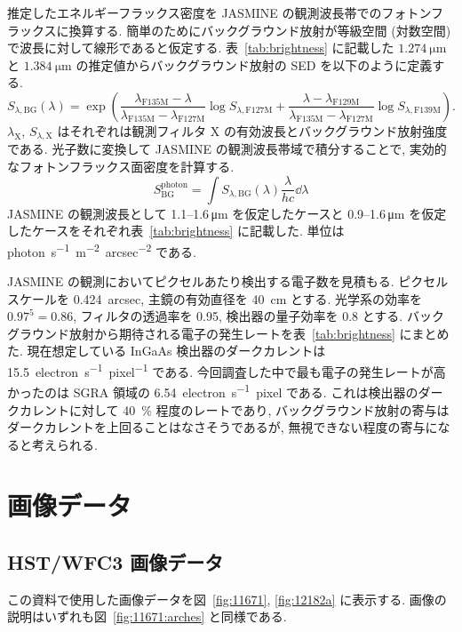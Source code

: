 \documentclass[10pt,a4paper,dvipdfmx,uplatex]{jsarticle}
\begin{document}
推定したエネルギーフラックス密度を JASMINE の観測波長帯でのフォトンフラックスに換算する. 簡単のためにバックグラウンド放射が等級空間 (対数空間) で波長に対して線形であると仮定する. 表~\ref{tab:brightness} に記載した $\SI{1.274}{\micro\meter}$ と $\SI{1.384}{\micro\meter}$ の推定値からバックグラウンド放射の SED を以下のように定義する.
\begin{equation}
  S_{\lambda,\text{BG}}(\lambda) =
  \exp(
    \frac{\lambda_\text{F135M}-\lambda}{\lambda_\text{F135M}-\lambda_\text{F127M}}
    \log{S_{\lambda,\text{F127M}}}
    +\frac{\lambda-\lambda_\text{F129M}}{\lambda_\text{F135M}-\lambda_\text{F127M}}
    \log{S_{\lambda,\text{F139M}}}
  ).
  \label{eq:sed}
\end{equation}
$\lambda_\text{X}$, $S_{\lambda,\text{X}}$ はそれぞれは観測フィルタ X の有効波長とバックグラウンド放射強度である. 光子数に変換して JASMINE の観測波長帯域で積分することで, 実効的なフォトンフラックス面密度を計算する.
\begin{equation}
  S^\text{photon}_\text{BG}
  = \int S_{\lambda,\text{BG}}(\lambda) \frac{\lambda}{hc} \dd{\lambda}
\end{equation}
JASMINE の観測波長として \numrange{1.1}{1.6}\,\unit{\micro\meter} を仮定したケースと \numrange{0.9}{1.6}\,\unit{\micro\meter} を仮定したケースをそれぞれ表~\ref{tab:brightness} に記載した. 単位は \unit{photon.s^{-1}.m^{-2}.arcsec^{-2}} である.

JASMINE の観測においてピクセルあたり検出する電子数を見積もる. ピクセルスケールを \SI{0.424}{arcsec}, 主鏡の有効直径を \SI{40}{\centi\meter} とする. 光学系の効率を $0.97^5 = 0.86$, フィルタの透過率を 0.95, 検出器の量子効率を 0.8 とする. バックグラウンド放射から期待される電子の発生レートを表~\ref{tab:brightness} にまとめた. 現在想定している InGaAs 検出器のダークカレントは \SI{15.5}{electron.s^{-1}.pixel^{-1}} である. 今回調査した中で最も電子の発生レートが高かったのは SGRA 領域の \SI{6.54}{electron.s^{-1}.pixel} である. これは検出器のダークカレントに対して \SI{40}{\percent} 程度のレートであり, バックグラウンド放射の寄与はダークカレントを上回ることはなさそうであるが, 無視できない程度の寄与になると考えられる.


\appendix
\section{画像データ}
\subsection{HST/WFC3 画像データ}
この資料で使用した画像データを図~\ref{fig:11671}, \ref{fig:12182a} に表示する. 画像の説明はいずれも図~\ref{fig:11671:arches} と同様である.
\end{document}
